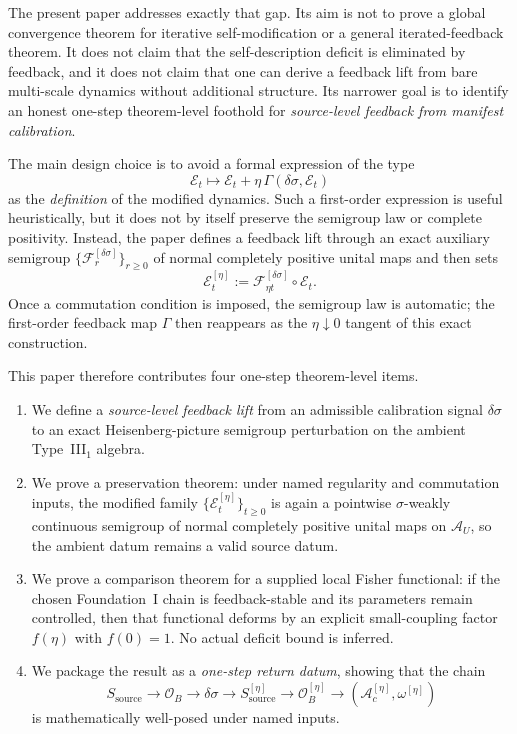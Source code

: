 \documentclass[12pt]{article}
\theoremstyle{definition}
\theoremstyle{remark}
\begin{document}
The present paper addresses exactly that gap. Its aim is not to prove a
global convergence theorem for iterative self-modification or a general
iterated-feedback theorem. It does not claim that the self-description deficit
is eliminated by feedback, and it does not claim that one can derive a
feedback lift from bare multi-scale dynamics without additional
structure. Its narrower goal is to identify an honest one-step
theorem-level foothold for \emph{source-level feedback from manifest
calibration}.

The main design choice is to avoid a formal expression of the type
\[
\mathcal E_t \mapsto \mathcal E_t + \eta\,\Gamma(\delta\sigma,\mathcal E_t)
\]
as the \emph{definition} of the modified dynamics. Such a first-order
expression is useful heuristically, but it does not by itself preserve
the semigroup law or complete positivity. Instead, the paper defines a
feedback lift through an exact auxiliary semigroup
\(\{\mathscr F_r^{[\delta\sigma]}\}_{r\ge 0}\) of normal completely
positive unital maps and then sets
\[
\mathcal E_t^{[\eta]}
:=
\mathscr F_{\eta t}^{[\delta\sigma]}\circ\mathcal E_t.
\]
Once a commutation condition is imposed, the semigroup law is automatic;
the first-order feedback map \(\Gamma\) then reappears as the
\(\eta\downarrow 0\) tangent of this exact construction.

This paper therefore contributes four one-step theorem-level items.
\begin{enumerate}
\item We define a \emph{source-level feedback lift} from an admissible
  calibration signal \(\delta\sigma\) to an exact Heisenberg-picture
  semigroup perturbation on the ambient Type~III\(_1\) algebra.
\item We prove a preservation theorem: under named regularity and
  commutation inputs, the modified family
  \(\{\mathcal E_t^{[\eta]}\}_{t\ge0}\) is again a pointwise
  \(\sigma\)-weakly continuous semigroup of normal completely positive
  unital maps on \(\mathcal A_U\), so the ambient datum remains a valid
  source datum.
\item We prove a comparison theorem for a supplied local Fisher
  functional: if the chosen Foundation~I chain is feedback-stable and
  its parameters remain controlled, then that functional deforms by an
  explicit small-coupling factor \(f(\eta)\) with \(f(0)=1\). No actual
  deficit bound is inferred.
\item We package the result as a \emph{one-step return datum},
  showing that the chain
  \[
  S_{\mathrm{source}}
  \to
  \mathcal O_B
  \to
  \delta\sigma
  \to
  S_{\mathrm{source}}^{[\eta]}
  \to
  \mathcal O_B^{[\eta]}
  \to
  (\mathcal A_c^{[\eta]},\omega^{[\eta]})
  \]
  is mathematically well-posed under named inputs.
\end{enumerate}
\end{document}
